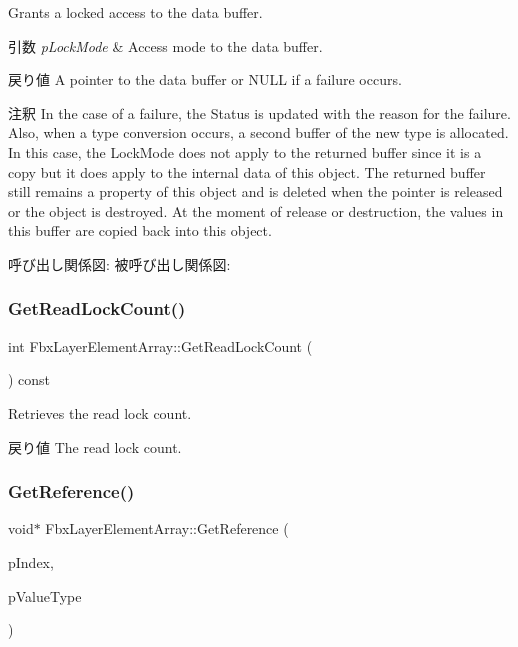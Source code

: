 Grants a locked access to the data buffer. 
\begin{DoxyParams}{引数}
{\em p\+Lock\+Mode} & Access mode to the data buffer. \\
\hline
\end{DoxyParams}
\begin{DoxyReturn}{戻り値}
A pointer to the data buffer or N\+U\+LL if a failure occurs. 
\end{DoxyReturn}
\begin{DoxyRemark}{注釈}
In the case of a failure, the Status is updated with the reason for the failure. Also, when a type conversion occurs, a second buffer of the new type is allocated. In this case, the Lock\+Mode does not apply to the returned buffer since it is a copy but it does apply to the internal data of this object. The returned buffer still remains a property of this object and is deleted when the pointer is released or the object is destroyed. At the moment of release or destruction, the values in this buffer are copied back into this object. 
\end{DoxyRemark}
呼び出し関係図\+:
被呼び出し関係図\+:
\mbox{\label{class_fbx_layer_element_array_a2d832cc56fee7d1c1254e88e689f1eda}} 
\subsubsection{\texorpdfstring{Get\+Read\+Lock\+Count()}{GetReadLockCount()}}
{\footnotesize\ttfamily int Fbx\+Layer\+Element\+Array\+::\+Get\+Read\+Lock\+Count (\begin{DoxyParamCaption}{ }\end{DoxyParamCaption}) const}

Retrieves the read lock count. \begin{DoxyReturn}{戻り値}
The read lock count. 
\end{DoxyReturn}
\mbox{\label{class_fbx_layer_element_array_a310ca26651e00014d24f9b70d8a0ef00}} 
\subsubsection{\texorpdfstring{Get\+Reference()}{GetReference()}}
{\footnotesize\ttfamily void$\ast$ Fbx\+Layer\+Element\+Array\+::\+Get\+Reference (\begin{DoxyParamCaption}\item[{int}]{p\+Index,  }\item[{\hyperlink{fbxpropertytypes_8h_a73913a5ddfb20e57c6f25e9e6784bd92}{E\+Fbx\+Type}}]{p\+Value\+Type }\end{DoxyParamCaption})\hspace{0.3cm}{\ttfamily [protected]}}

